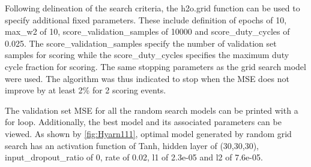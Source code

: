 \documentclass[12pt,twoside]{amherstthesis}
\begin{document}
  Following delineation of the search criteria, the h2o.grid function can
  be used to specify additional fixed parameters. These include definition
  of epochs of 10, max\_w2 of 10, score\_validation\_samples of 10000 and
  score\_duty\_cycles of 0.025. The score\_validation\_samples specify the
  number of validation set samples for scoring while the
  score\_duty\_cycles specifies the maximum duty cycle fraction for
  scoring. The same stopping parameters as the grid search model were
  used. The algorithm was thus indicated to stop when the MSE does not
  improve by at least 2\% for 2 scoring events.
  
  \begin{Shaded}
  \begin{Highlighting}[]
  \StringTok{ }\NormalTok{(}
    \NormalTok{,}
     \NormalTok{,}
    \NormalTok{,}
    \NormalTok{,}
    \NormalTok{,}
    \NormalTok{,        }
    \NormalTok{,}
    \NormalTok{, }
    \NormalTok{,         }
    \NormalTok{,                      }
     
     
  \NormalTok{)}
  \end{Highlighting}
  \end{Shaded}
  
  The validation set MSE for all the random search models can be printed
  with a for loop. Additionally, the best model and its associated
  parameters can be viewed. As shown by \autoref{fig:Hyarn111}, optimal
  model generated by random grid search has an activation function of
  Tanh, hidden layer of (30,30,30), input\_dropout\_ratio of 0, rate of
  0.02, l1 of 2.3e-05 and l2 of 7.6e-05.
  
\end{document}
